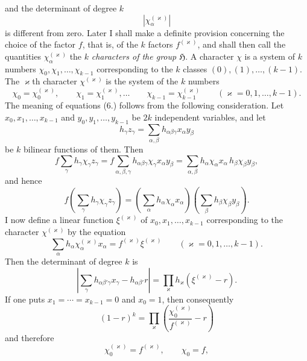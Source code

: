 \documentclass[11pt]{article}
\newcommand{\grp}{\mathfrak{H}}
\begin{document}
and the determinant of degree $k$
\begin{equation*}\tag{8.}
\left|\chi_\alpha^{(\varkappa)}\right|
\end{equation*}
is different from zero. Later I shall make a definite provision concerning the choice of the factor $f$, that is, of the $k$ factors $f^{(\varkappa)}$, and shall then call the quantities $\chi_\alpha^{(\varkappa)}$ the $k$ \emph{characters of the group $\grp$}. A character $\chi$ is a system of $k$ numbers $\chi_0,\chi_1,\ldots,\chi_{k-1}$ corresponding to the $k$ classes $(0),(1),\ldots,(k-1)$. The $\varkappa$th character $\chi^{(\varkappa)}$ is the system of the $k$ numbers
\[
\chi_0=\chi_0^{(\varkappa)},\qquad \chi_1=\chi_1^{(\varkappa)},\ldots\qquad \chi_{k-1}=\chi_{k-1}^{(\varkappa)}\qquad(\varkappa=0,1,\ldots,k-1).
\]
The meaning of equations (6.) follows from the following consideration. Let $x_0,x_1,\ldots,x_{k-1}$ and $y_0,y_1,\ldots,y_{k-1}$ be $2k$ independent variables, and let
\begin{equation*}\tag{9.}
h_\gamma z_\gamma=\sum_{\alpha,\beta}h_{\alpha\beta\gamma}x_\alpha y_\beta
\end{equation*}
be $k$ bilinear functions of them. Then
\[
f\sum_\gamma h_\gamma\chi_\gamma z_\gamma
=f\sum_{\alpha,\beta,\gamma}h_{\alpha\beta\gamma}\chi_\gamma x_\alpha y_\beta
=\sum_{\alpha,\beta}h_\alpha\chi_\alpha x_\alpha\,h_\beta\chi_\beta y_\beta,
\]
and hence
\begin{equation*}\tag{10.}
f\left(\sum_\gamma h_\gamma\chi_\gamma z_\gamma\right)=
\left(\sum_\alpha h_\alpha\chi_\alpha x_\alpha\right)
\left(\sum_\beta h_\beta\chi_\beta y_\beta\right).
\end{equation*}
I now define a linear function $\xi^{(\varkappa)}$ of $x_0,x_1,\ldots,x_{k-1}$ corresponding to the character $\chi^{(\varkappa)}$ by the equation
\begin{equation*}\tag{11.}
\sum_\alpha h_\alpha\chi_\alpha^{(\varkappa)}x_\alpha=f^{(\varkappa)}\xi^{(\varkappa)}\qquad(\varkappa=0,1,\ldots,k-1).
\end{equation*}
Then the determinant of degree $k$ is
\begin{equation*}\tag{12.}
\left|\sum_\gamma h_{\alpha\beta'\gamma}x_\gamma-h_{\alpha\beta'}r\right|=
\prod_\varkappa h_\varkappa\left(\xi^{(\varkappa)}-r\right).
\end{equation*}
If one puts $x_1=\cdots=x_{k-1}=0$ and $x_0=1$, then consequently
\[
(1-r)^k=\prod_\varkappa\left(\frac{\chi_0^{(\varkappa)}}{f^{(\varkappa)}}-r\right)
\]
and therefore
\begin{equation*}\tag{13.}
\chi_0^{(\varkappa)}=f^{(\varkappa)},\qquad \chi_0=f,
\end{equation*}
\end{document}

